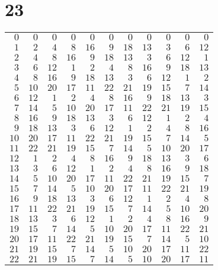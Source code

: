\documentclass[a4paper]{scrartcl}
\begin{document}
\section*{23}
\begin{tabular}{rrrrrrrrrrr}
\toprule
$0$ & $0$ & $0$ & $0$ & $0$ & $0$ & $0$ & $0$ & $0$ & $0$ & $0$ \\
$1$ & $2$ & $4$ & $8$ & $16$ & $9$ & $18$ & $13$ & $3$ & $6$ & $12$ \\
$2$ & $4$ & $8$ & $16$ & $9$ & $18$ & $13$ & $3$ & $6$ & $12$ & $1$ \\
$3$ & $6$ & $12$ & $1$ & $2$ & $4$ & $8$ & $16$ & $9$ & $18$ & $13$ \\
$4$ & $8$ & $16$ & $9$ & $18$ & $13$ & $3$ & $6$ & $12$ & $1$ & $2$ \\
$5$ & $10$ & $20$ & $17$ & $11$ & $22$ & $21$ & $19$ & $15$ & $7$ & $14$ \\
$6$ & $12$ & $1$ & $2$ & $4$ & $8$ & $16$ & $9$ & $18$ & $13$ & $3$ \\
$7$ & $14$ & $5$ & $10$ & $20$ & $17$ & $11$ & $22$ & $21$ & $19$ & $15$ \\
$8$ & $16$ & $9$ & $18$ & $13$ & $3$ & $6$ & $12$ & $1$ & $2$ & $4$ \\
$9$ & $18$ & $13$ & $3$ & $6$ & $12$ & $1$ & $2$ & $4$ & $8$ & $16$ \\
$10$ & $20$ & $17$ & $11$ & $22$ & $21$ & $19$ & $15$ & $7$ & $14$ & $5$ \\
$11$ & $22$ & $21$ & $19$ & $15$ & $7$ & $14$ & $5$ & $10$ & $20$ & $17$ \\
$12$ & $1$ & $2$ & $4$ & $8$ & $16$ & $9$ & $18$ & $13$ & $3$ & $6$ \\
$13$ & $3$ & $6$ & $12$ & $1$ & $2$ & $4$ & $8$ & $16$ & $9$ & $18$ \\
$14$ & $5$ & $10$ & $20$ & $17$ & $11$ & $22$ & $21$ & $19$ & $15$ & $7$ \\
$15$ & $7$ & $14$ & $5$ & $10$ & $20$ & $17$ & $11$ & $22$ & $21$ & $19$ \\
$16$ & $9$ & $18$ & $13$ & $3$ & $6$ & $12$ & $1$ & $2$ & $4$ & $8$ \\
$17$ & $11$ & $22$ & $21$ & $19$ & $15$ & $7$ & $14$ & $5$ & $10$ & $20$ \\
$18$ & $13$ & $3$ & $6$ & $12$ & $1$ & $2$ & $4$ & $8$ & $16$ & $9$ \\
$19$ & $15$ & $7$ & $14$ & $5$ & $10$ & $20$ & $17$ & $11$ & $22$ & $21$ \\
$20$ & $17$ & $11$ & $22$ & $21$ & $19$ & $15$ & $7$ & $14$ & $5$ & $10$ \\
$21$ & $19$ & $15$ & $7$ & $14$ & $5$ & $10$ & $20$ & $17$ & $11$ & $22$ \\
$22$ & $21$ & $19$ & $15$ & $7$ & $14$ & $5$ & $10$ & $20$ & $17$ & $11$ \\
\bottomrule
\end{tabular}
\end{document}
